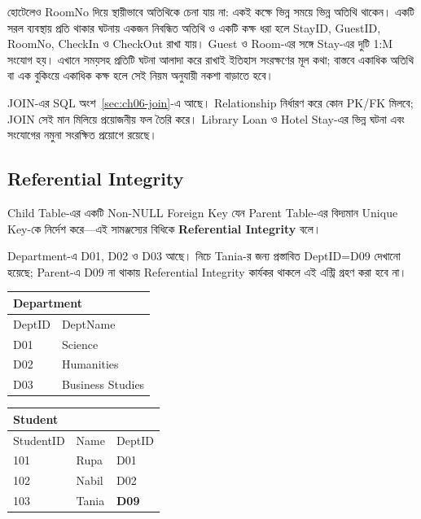হোটেলেও RoomNo দিয়ে স্থায়ীভাবে অতিথিকে চেনা যায় না: একই কক্ষে ভিন্ন সময়ে ভিন্ন অতিথি থাকেন। একটি সরল ব্যবস্থায় প্রতি থাকার ঘটনায় একজন নিবন্ধিত অতিথি ও একটি কক্ষ ধরা হলে StayID, GuestID, RoomNo, CheckIn ও CheckOut রাখা যায়। Guest ও Room-এর সঙ্গে Stay-এর দুটি 1:M সংযোগ হয়। এখানে সময়সহ প্রতিটি ঘটনা আলাদা করে রাখাই ইতিহাস সংরক্ষণের মূল কথা; বাস্তবে একাধিক অতিথি বা এক বুকিংয়ে একাধিক কক্ষ হলে সেই নিয়ম অনুযায়ী নকশা বাড়াতে হবে।

JOIN-এর SQL অংশ~\ref{sec:ch06-join}-এ আছে। Relationship নির্ধারণ করে কোন PK/FK মিলবে; JOIN সেই মান মিলিয়ে প্রয়োজনীয় ফল তৈরি করে। Library Loan ও Hotel Stay-এর ভিন্ন ঘটনা এবং সংযোগের নমুনা সংরক্ষিত প্রয়োগে রয়েছে।

\subsection{Referential Integrity}

\begin{definitionbox}{}

Child Table-এর একটি Non-NULL Foreign Key যেন Parent Table-এর
বিদ্যমান Unique Key-কে নির্দেশ করে---এই সামঞ্জস্যের বিধিকে
\textbf{Referential Integrity} বলে।

\end{definitionbox}


Department-এ D01, D02 ও D03 আছে। নিচে Tania-র জন্য প্রস্তাবিত
DeptID=D09 দেখানো হয়েছে; Parent-এ D09 না থাকায় Referential Integrity
কার্যকর থাকলে এই এন্ট্রি গ্রহণ করা হবে না।

\begin{flushleft}
\small
\renewcommand{\arraystretch}{1.08}

\begin{minipage}[t]{0.34\linewidth}
\raggedright

\begin{tabular}{|l|l|}
\hline
\multicolumn{2}{|l|}{\textbf{Department}}\\
\hline
DeptID & DeptName\\
\hline
D01 & Science\\\hline
D02 & Humanities\\\hline
D03 & Business Studies\\
\hline
\end{tabular}

\end{minipage}
\hfill
\begin{minipage}[t]{0.56\linewidth}
\raggedright

\begin{tabular}{|l|l|l|}
\hline
\multicolumn{3}{|l|}{\textbf{Student}}\\
\hline
StudentID & Name & DeptID\\
\hline
101 & Rupa & D01\\\hline
102 & Nabil & D02\\\hline
103 & Tania & \textbf{D09}\\
\hline
\end{tabular}

\end{minipage}

\end{flushleft}


